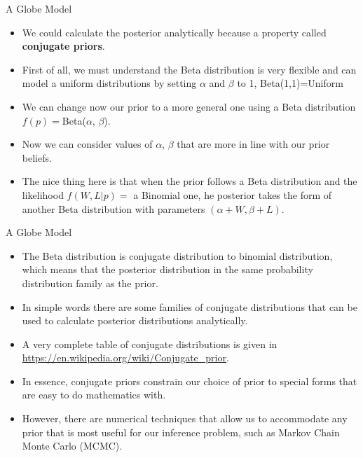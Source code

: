 \documentclass[handout]{beamer}
\begin{document}
\begin{frame}{A Globe Model}
\scriptsize{

\begin{itemize}

\item We could calculate the posterior analytically because a property called \textbf{conjugate priors}.

\item First of all, we must understand the Beta distribution is very flexible and can model a uniform distributions by setting $\alpha$ and $\beta$ to 1,  Beta(1,1)=Uniform

\item We can change now our prior to a more general one using a Beta distribution $f(p)=$Beta($\alpha$, $\beta$).

\item Now we can consider values of $\alpha$, $\beta$ that are more in line with our prior beliefs.

\item The nice thing here is that when the prior follows a Beta distribution  and the likelihood $f(W,L|p)=$ a Binomial one, he posterior takes the form of another Beta distribution with parameters  $(\alpha+W,\beta+L)$.

\end{itemize}

} 

\end{frame}



\begin{frame}{A Globe Model}
\scriptsize{

\begin{itemize}
\item The Beta distribution is conjugate distribution to binomial distribution, which means that the posterior distribution in the same probability distribution family as the prior.

\item In simple words there are some families of conjugate distributions that can be used to calculate posterior distributions analytically.

\item A very complete table of conjugate distributions is given in \url{https://en.wikipedia.org/wiki/Conjugate_prior}.

\item In essence, conjugate priors constrain our choice of prior to special forms that are easy to do mathematics with.

\item However, there are numerical techniques that allow us to accommodate any prior that is most useful for our inference problem, such as Markov Chain Monte Carlo (MCMC).

\end{itemize}

} 

\end{frame}
\end{document}
